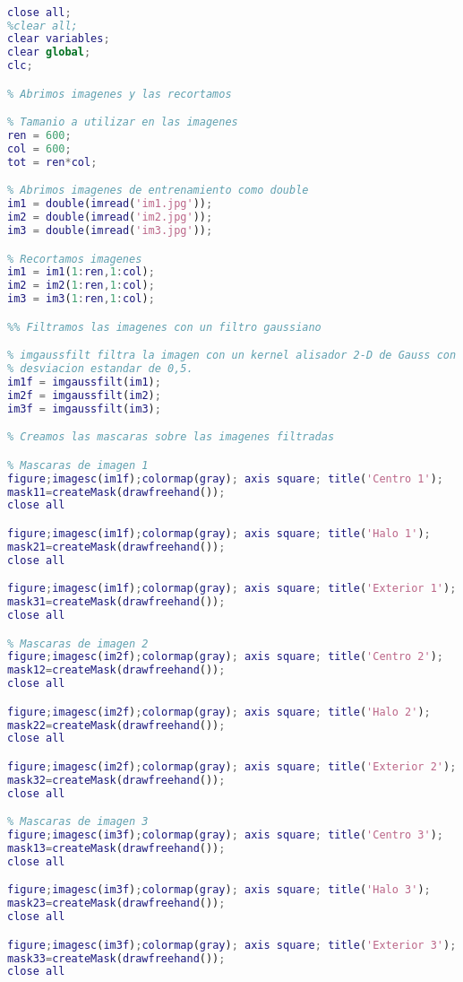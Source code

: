 \documentclass[10pt,journal,compsoc]{IEEEtran}\usepackage[T1]{fontenc}                              %
\begin{document}
\begin{lstlisting}[language=Matlab,basicstyle=\small]
%% Limpiamos entorno

close all;
%clear all;
clear variables;
clear global;
clc;

% Abrimos imagenes y las recortamos 

% Tamanio a utilizar en las imagenes
ren = 600;
col = 600;
tot = ren*col;

% Abrimos imagenes de entrenamiento como double
im1 = double(imread('im1.jpg'));
im2 = double(imread('im2.jpg'));
im3 = double(imread('im3.jpg'));

% Recortamos imagenes
im1 = im1(1:ren,1:col);
im2 = im2(1:ren,1:col);
im3 = im3(1:ren,1:col);

%% Filtramos las imagenes con un filtro gaussiano

% imgaussfilt filtra la imagen con un kernel alisador 2-D de Gauss con
% desviacion estandar de 0,5.
im1f = imgaussfilt(im1);
im2f = imgaussfilt(im2);
im3f = imgaussfilt(im3);

% Creamos las mascaras sobre las imagenes filtradas

% Mascaras de imagen 1
figure;imagesc(im1f);colormap(gray); axis square; title('Centro 1');
mask11=createMask(drawfreehand());
close all

figure;imagesc(im1f);colormap(gray); axis square; title('Halo 1');
mask21=createMask(drawfreehand());
close all

figure;imagesc(im1f);colormap(gray); axis square; title('Exterior 1');
mask31=createMask(drawfreehand());
close all

% Mascaras de imagen 2
figure;imagesc(im2f);colormap(gray); axis square; title('Centro 2');
mask12=createMask(drawfreehand());
close all

figure;imagesc(im2f);colormap(gray); axis square; title('Halo 2');
mask22=createMask(drawfreehand());
close all

figure;imagesc(im2f);colormap(gray); axis square; title('Exterior 2');
mask32=createMask(drawfreehand());
close all

% Mascaras de imagen 3
figure;imagesc(im3f);colormap(gray); axis square; title('Centro 3');
mask13=createMask(drawfreehand());
close all

figure;imagesc(im3f);colormap(gray); axis square; title('Halo 3');
mask23=createMask(drawfreehand());
close all

figure;imagesc(im3f);colormap(gray); axis square; title('Exterior 3');
mask33=createMask(drawfreehand());
close all


\end{lstlisting}
\end{document}
